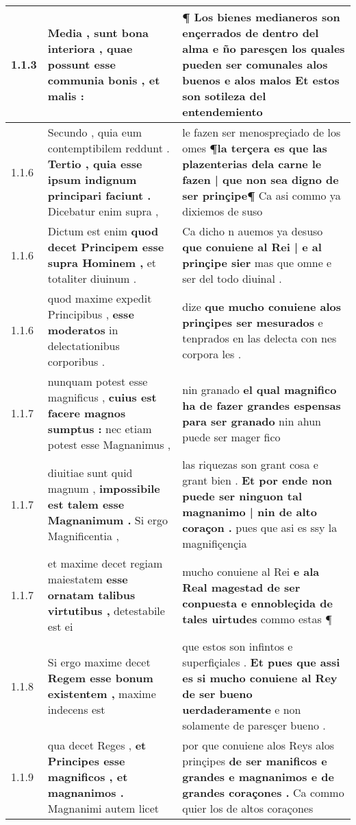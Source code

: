 \begin{tabular}{|p{1cm}|p{6.5cm}|p{6.5cm}|}

\hline
1.1.3 & Media , sunt bona interiora , \textbf{ quae possunt esse communia bonis , } et malis : & ¶ Los bienes medianeros son ençerrados de dentro del alma \textbf{ e ño paresçen los quales pueden ser comunales alos buenos e alos malos } Et estos son sotileza del entendemiento \\\hline
1.1.6 & Secundo , quia eum contemptibilem reddunt . \textbf{ Tertio , quia esse ipsum indignum principari faciunt . } Dicebatur enim supra , & le fazen ser menospreçiado de los omes \textbf{ ¶la terçera es que las plazenterias dela carne le fazen | que non sea digno de ser prinçipe¶ } Ca asi commo ya dixiemos de suso \\\hline
1.1.6 & Dictum est enim \textbf{ quod decet Principem esse supra Hominem , } et totaliter diuinum . & Ca dicho n auemos ya desuso \textbf{ que conuiene al Rei | e al prinçipe sier } mas que omne e ser del todo diuinal . \\\hline
1.1.6 & quod maxime expedit Principibus , \textbf{ esse moderatos } in delectationibus corporibus . & dize \textbf{ que mucho conuiene alos prinçipes ser mesurados } e tenprados en las delecta con nes corpora les . \\\hline
1.1.7 & nunquam potest esse magnificus , \textbf{ cuius est facere magnos sumptus : } nec etiam potest esse Magnanimus , & nin granado \textbf{ el qual magnifico ha de fazer grandes espensas para ser granado } nin ahun puede ser mager fico \\\hline
1.1.7 & diuitiae sunt quid magnum , \textbf{ impossibile est talem esse Magnanimum . } Si ergo Magnificentia , & las riquezas son grant cosa e grant bien . \textbf{ Et por ende non puede ser ninguon tal magnanimo | nin de alto coraçon . } pues que asi es ssy la magnifiçençia \\\hline
1.1.7 & et maxime decet regiam maiestatem \textbf{ esse ornatam talibus virtutibus , } detestabile est ei & mucho conuiene al Rei \textbf{ e ala Real magestad de ser conpuesta e ennobleçida de tales uirtudes } commo estas ¶ \\\hline
1.1.8 & Si ergo maxime decet \textbf{ Regem esse bonum existentem , } maxime indecens est & que estos son infintos e superfiçiales . \textbf{ Et pues que assi es si mucho conuiene al Rey de ser bueno uerdaderamente } e non solamente de paresçer bueno . \\\hline
1.1.9 & qua decet Reges , \textbf{ et Principes esse magnificos , et magnanimos . } Magnanimi autem licet & por que conuiene alos Reys alos prinçipes \textbf{ de ser manificos e grandes e magnanimos e de grandes coraçones . } Ca commo quier los de altos coraçones \\\hline

\end{tabular}
